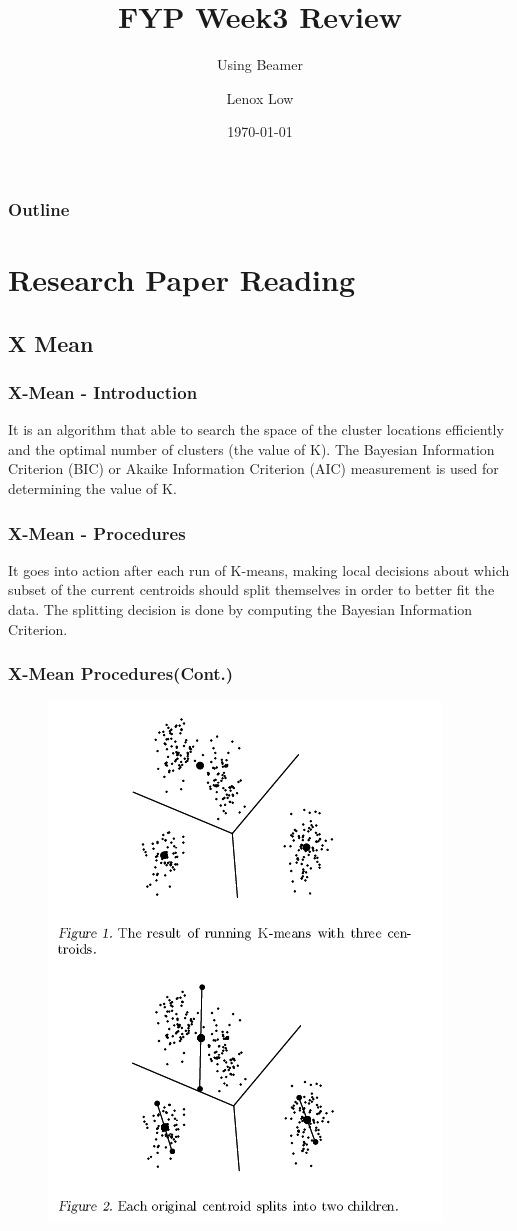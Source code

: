 \documentclass{beamer}
\title{FYP Week3 Review}
\subtitle{Using Beamer}
\author{Lenox Low}
\institute{Multimedia University Cyberjaya Campus}
\date{\today}
\begin{document}
\begin{frame}
\titlepage
\end{frame}

\begin{frame}
\frametitle{Outline}
\tableofcontents
\end{frame}

\section{Research Paper Reading}
\subsection{X Mean}

\begin{frame}
\frametitle{X-Mean - Introduction}
It is an algorithm that able to search the space of the cluster locations efficiently and the optimal number of clusters (the value of K). The Bayesian Information Criterion (BIC) or Akaike Information Criterion (AIC) measurement is used for determining the value of K. 

\end{frame}

\begin{frame}
\frametitle{X-Mean - Procedures}
It goes into action after each run of K-means, making local decisions about which subset of the current centroids should split themselves in order to better fit the data. The splitting decision is done by computing the Bayesian Information Criterion.
\end{frame}

\begin{frame}
\frametitle{X-Mean Procedures(Cont.)}
\begin{figure}[hbt!]\centering
\includegraphics[scale=0.3]{image/xmean1}
\end{figure}
\end{frame}
\end{document}
